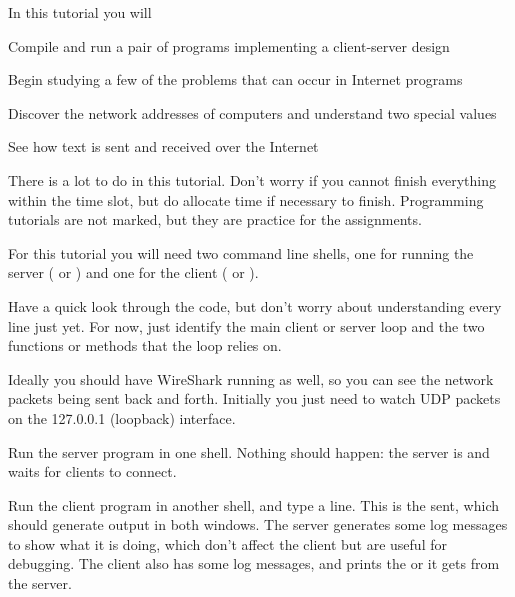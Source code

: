 










In this tutorial you will

\DOT Compile and run a pair of programs implementing a client-server design

\DOT Begin studying a few of the problems that can occur in Internet programs

\DOT Discover the network addresses of computers and understand two special values

\DOT See how text is sent and received over the Internet

\begin{IMPORTANT}
There is a lot to do in this tutorial. Don't worry if you cannot finish everything
within the time slot, but do allocate time if necessary to finish. Programming
tutorials are not marked, but they are practice for the assignments.
\end{IMPORTANT}



For this tutorial you will need two command line shells, one for running
the server ( or ) and one for the client
( or ).

Have a quick look through the code, but don't worry about understanding every
line just yet. For now, just identify the main client or server loop and the two
functions or methods that the loop relies on.

Ideally you should have WireShark running as well, so you can see the network
packets being sent back and forth. Initially you just need to watch UDP packets
on the 127.0.0.1 (loopback) interface.

Run the server program in one shell. Nothing should happen: the server is 
and waits for clients to connect.

Run the client program in another shell, and type a line. This is the 
sent, which should generate output in both windows.
The server generates some log messages to show what it is doing, which don't affect
the client but are useful for debugging. The client also has some log messages, and
prints the  or  it gets from the server.

